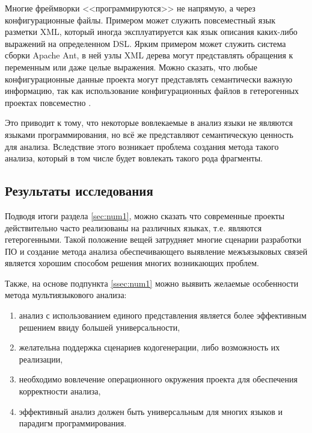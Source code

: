 Многие фреймворки <<программируются>> не напрямую, а через конфигурационные файлы. Примером может служить
повсеместный язык разметки XML, который иногда эксплуатируется как язык описания каких-либо выражений на
определенном DSL. Ярким примером может служить система сборки Apache Ant, в ней узлы XML дерева
могут представлять обращения к переменным или даже целые выражения. Можно сказать, что любые конфигурационные
данные проекта могут представлять семантически важную информацию, так как использование конфигурационных
файлов в гетерогенных проектах повсеместно \cite{external-dependencies}.

Это приводит к тому, что некоторые вовлекаемые в анализ языки не являются языками программирования, но
всё же представляют семантическую ценность для анализа. Вследствие этого возникает проблема создания
метода такого анализа, который в том числе будет вовлекать такого рода фрагменты.

\subsection{Результаты исследования}

Подводя итоги раздела \ref{sec:num1}, можно сказать что современные проекты действительно
часто реализованы на различных языках, т.е. являются гетерогенными. Такой положение вещей
затрудняет многие сценарии разработки ПО и создание метода анализа обеспечивающего выявление межъязыковых
связей является хорошим способом решения многих возникающих проблем.

Также, на основе подпункта \ref{ssec:num1} можно выявить желаемые особенности метода мультиязыкового анализа:
\begin{enumerate}[1)]
    \item анализ с использованием единого представления является более эффективным решением ввиду большей универсальности,
    \item желательна поддержка сценариев кодогенерации, либо возможность их реализации,
    \item необходимо вовлечение операционного окружения проекта для обеспечения корректности анализа,
    \item эффективный анализ должен быть универсальным для многих языков и парадигм программирования.
\end{enumerate}

\clearpage